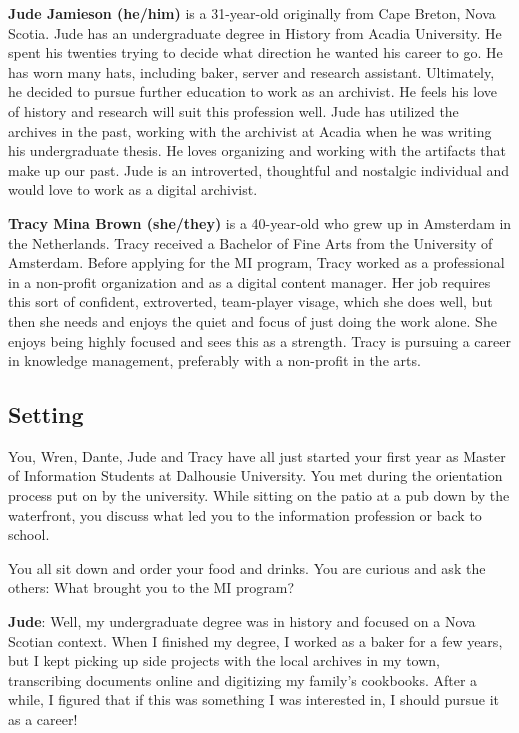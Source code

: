 \documentclass[
  letterpaper,
  DIV=11,
  numbers=noendperiod]{scrreprt}
\begin{document}
\textbf{Jude Jamieson (he/him)} is a 31-year-old originally from Cape
Breton, Nova Scotia. Jude has an undergraduate degree in History from
Acadia University. He spent his twenties trying to decide what direction
he wanted his career to go. He has worn many hats, including baker,
server and research assistant. Ultimately, he decided to pursue further
education to work as an archivist. He feels his love of history and
research will suit this profession well. Jude has utilized the archives
in the past, working with the archivist at Acadia when he was writing
his undergraduate thesis. He loves organizing and working with the
artifacts that make up our past. Jude is an introverted, thoughtful and
nostalgic individual and would love to work as a digital archivist.

\textbf{Tracy Mina Brown (she/they)} is a 40-year-old who grew up in
Amsterdam in the Netherlands. Tracy received a Bachelor of Fine Arts
from the University of Amsterdam. Before applying for the MI program,
Tracy worked as a professional in a non-profit organization and as a
digital content manager. Her job requires this sort of confident,
extroverted, team-player visage, which she does well, but then she needs
and enjoys the quiet and focus of just doing the work alone. She enjoys
being highly focused and sees this as a strength. Tracy is pursuing a
career in knowledge management, preferably with a non-profit in the
arts.

\subsection{Setting}\label{setting}

You, Wren, Dante, Jude and Tracy have all just started your first year
as Master of Information Students at Dalhousie University. You met
during the orientation process put on by the university. While sitting
on the patio at a pub down by the waterfront, you discuss what led you
to the information profession or back to school.

You all sit down and order your food and drinks. You are curious and ask
the others: What brought you to the MI program?

\textbf{Jude}: Well, my undergraduate degree was in history and focused
on a Nova Scotian context. When I finished my degree, I worked as a
baker for a few years, but I kept picking up side projects with the
local archives in my town, transcribing documents online and digitizing
my family's cookbooks. After a while, I figured that if this was
something I was interested in, I should pursue it as a career!
\end{document}
